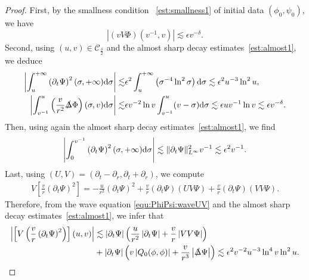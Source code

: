 \documentclass[a4paper,reqno]{amsart}
\theoremstyle{definition}
\numberwithin{equation}{section}
\def \d {{\rm{d}}}
\def \pt{\partial_{t}}
\def \pr{\partial_{r}}
\def\Deltas{\slashed{\Delta}}
\def\ep{\epsilon}
\def\lab{\label}
\begin{document}
\begin{proof}
First, by the smallness condition ~\eqref{est:smallness1} of initial data $(\phi_{0},\psi_{0})$, we have
\begin{equation}
\lab{eq:RegionII:VPhi:initialdatacontrol}
  \left|  \left(vV\Phi\right)(v^{-1},v)\right|\lesssim
 \ep v^{-\delta}.
\end{equation}
Second, using $(u,v)\in \mathcal{C}_{\frac{\delta}{2}}$ and the almost sharp decay estimates~\eqref{est:almost1}, we deduce
\begin{equation}
\label{eq:RegionII:VPhi:lowerordercontrol}
\begin{aligned}
\left|\int_{u}^{+\infty}\left(\pt \Psi\right)^{2}(\sigma,+\infty)\d \sigma\right|
\lesssim&\epsilon^{2} \int_{u}^{+\infty} \left(\sigma^{-4} \ln^{2} \sigma\right)\d \sigma\lesssim \epsilon^{2}u^{-3}\ln^{2}u,\\
 \left|\int_{v^{-1}}^{u}\left(\frac{v}{r^{2}}\Deltas\Phi\right)(\sigma,v)\d \sigma\right|\lesssim&\epsilon v^{-2}\ln v\int_{v^{-1}}^{u}(v-\sigma)\d \sigma\lesssim \epsilon uv^{-1}\ln v\lesssim \ep v^{-\delta}.
\end{aligned}
\end{equation}
Then, using again the almost sharp decay estimates~\eqref{est:almost1}, we find 
\begin{equation}\label{eq:RegionII:VPhi:lowerordercontrol2}
    \left|\int_{0}^{v^{-1}}\left(\pt \Psi\right)^{2}(\sigma,+\infty)\d \sigma   \right|
    \lesssim \|\pt \Psi\|_{L^{\infty}}^{2}v^{-1}
\lesssim \ep^2 v^{-1}.
\end{equation}
Last, using $(U,V)=(\pt-\pr,\pt+\pr)$, we compute 
\begin{equation*}
\begin{aligned}
V\left[\frac{v}{r}\left(\pt \Psi\right)^{2}\right]
=-\frac{u}{r^{2}}\left(\pt \Psi\right)^{2}+\frac{v}{r}\left(\pt \Psi\right)\left(UV\Psi\right)
+\frac{v}{r}\left(\pt \Psi\right)\left(VV\Psi\right).
\end{aligned}
\end{equation*}
Therefore, from the wave equation \eqref{equ:PhiPsi:waveUV} and the almost sharp decay estimates~\eqref{est:almost1}, we infer that
\begin{equation*}
\begin{aligned}
\left|\left[V\left(\frac{v}{r}\left(\pt \Psi\right)^{2}\right)\right](u,v)\right|
&\lesssim \left|\pt \Psi\right|\left(\frac{u}{r^{2}}\left|\pt \Psi\right|+\frac{v}{r}\left|VV\Psi\right|\right)\\
&+\left|\pt \Psi\right|\left(v\left|Q_{0}(\phi,\phi)\right|+\frac{v}{r^{3}}\left|\Deltas \Psi\right|\right)\lesssim \ep^2v^{-2}u^{-3}\ln^4 v\ln^{2}u.

\end{aligned}
\end{equation*}
\end{proof}
\end{document}

